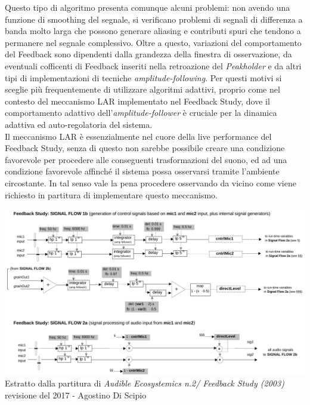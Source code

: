 Questo tipo di algoritmo presenta comunque alcuni problemi: non avendo
una funzione di smoothing del segnale, si verificano problemi di segnali di differenza a banda
molto larga che possono generare aliasing e contributi spuri che tendono a permanere nel
segnale complessivo.
Oltre a questo, variazioni del comportamento del Feedback sono dipendenti dalla grandezza
della finestra di osservazione, da eventuali cofficenti di Feedback inseriti nella
retroazione del \textit{Peakholder} e da altri tipi di implementazioni di tecniche 
\textit{amplitude-following}. Per questi motivi si sceglie più frequentemente di utilizzare algoritmi
adattivi, proprio come nel contesto del meccanismo LAR implementato nel Feedback Study,
dove il comportamento adattivo dell'\textit{amplitude-follower} è cruciale
per la dinamica adattiva ed auto-regolatoria del sistema.\\
Il meccanismo LAR è essenzialmente nel cuore della live performance del Feedback Study,
senza di questo non sarebbe possibile creare una condizione favorevole per procedere alle 
conseguenti trasformazioni del suono, ed ad una condizione favorevole affinché il 
sistema possa osservarsi tramite l'ambiente circostante. 
In tal senso vale la pena procedere osservando da vicino come viene richiesto in partitura 
di implementare questo meccanismo.

\begin{center}
\includegraphics[width=14cm]{figures/LARFeedbackstudy2017.pdf} \\
{Estratto dalla partitura di \textit{Audible Ecosystemics n.2/ Feedback Study (2003)} \\
revisione del 2017 - Agostino Di Scipio} \\ 
\vspace{0.5cm}
\end{center}

